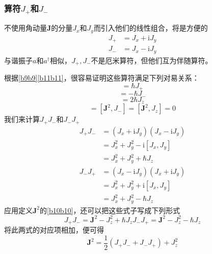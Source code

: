 \documentclass[]{article}
\begin{document}
\subsubsection{算符$J_+$和$J_-$}
不使用角动量$\boldsymbol{J}$的分量$J_x$和$J_y$而引入他们的线性组合，将是方便的
\begin{align}
	J_+&=J_x+\mathrm{i}J_y\nonumber\\
	J_-&=J_x-\mathrm{i}J_y
	\label{c1c1}
\end{align}
与谐振子$a$和$a^\dagger$相似，$J_+,J_-$不是厄米算符，但他们互为伴随算符。\par 
根据\eqref{b9b9}\eqref{b11b11}，很容易证明这些算符满足下列对易关系：
\begin{equation}
	[J_z,J_+]=\hbar J_+
\end{equation}
\begin{equation}
	[J_z,J_-]=-\hbar J_-
\end{equation}
\begin{equation}
	[J_+,J_-]=2\hbar J_z
\end{equation}
\begin{equation}
	[\boldsymbol{J}^2,J_+]=[\boldsymbol{J}^2,J_-]=[\boldsymbol{J}^2,J_z]=0
\end{equation}
我们来计算$J_+J_-$和$J_-J_+$
\begin{align}
	J_+J_-&=(J_x+\mathrm{i}J_y)(J_x-\mathrm{i}J_y)\nonumber\\
	&=J_x^2+J_y^2-\mathrm{i}[J_x,J_y]\nonumber\\
	&=J_x^2+J_y^2+\hbar J_z
\end{align}
\begin{align}
	J_-J_+&=(J_x-\mathrm{i}J_y)(J_x+\mathrm{i}J_y)\nonumber\\
	&=J_x^2+J_y^2+\mathrm{i}[J_x,J_y]\nonumber\\
	&=J_x^2+J_y^2-\hbar J_z
\end{align}
应用定义$\boldsymbol{J}^2$的\eqref{b10b10}，还可以把这些式子写成下列形式
\begin{subequations}
	\begin{equation}
		J_+J_-=\boldsymbol{J}^2-J_z^2+\hbar J_z
	\end{equation}
	\begin{equation}
	J_-J_+=\boldsymbol{J}^2-J_z^2-\hbar J_z
	\end{equation}
\label{c7c7}
\end{subequations}
将此两式的对应项相加，便可得
\begin{equation}
	\boldsymbol{J}^2=\dfrac{1}{2}(J_+J_-+J_-J_+)+J_z^2
\end{equation}
\end{document}
